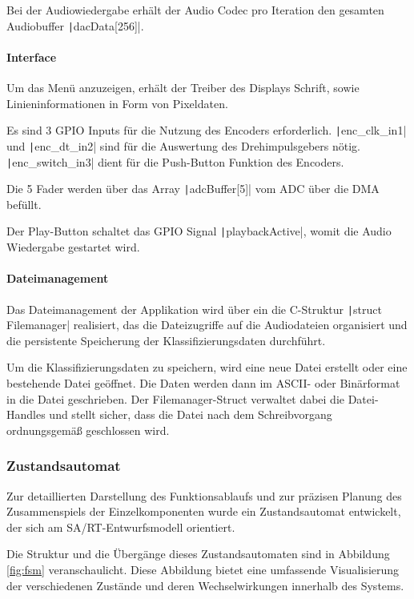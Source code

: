 Bei der Audiowiedergabe erhält der Audio Codec pro Iteration den gesamten Audiobuffer \texttt|dacData[256]|.

\paragraph{Interface}

Um das Menü anzuzeigen, erhält der Treiber des Displays Schrift, sowie Linieninformationen in Form von Pixeldaten. 

Es sind 3 GPIO Inputs für die Nutzung des Encoders erforderlich. \texttt|enc_clk_in1| und \texttt|enc_dt_in2| sind für die Auswertung des Drehimpulsgebers nötig. \texttt|enc_switch_in3| dient für die Push-Button Funktion des Encoders.

Die 5 Fader werden über das Array \texttt|adcBuffer[5]| vom ADC über die DMA befüllt.

Der Play-Button schaltet das GPIO Signal \texttt|playbackActive|, womit die Audio Wiedergabe gestartet wird.

\paragraph{Dateimanagement}

Das Dateimanagement der Applikation wird über ein die C-Struktur \texttt|struct Filemanager| realisiert, das die Dateizugriffe auf die Audiodateien organisiert und die persistente Speicherung der Klassifizierungsdaten durchführt.  

Um die Klassifizierungsdaten zu speichern, wird eine neue Datei erstellt oder eine bestehende Datei geöffnet. Die Daten werden dann im ASCII- oder Binärformat in die Datei geschrieben. Der Filemanager-Struct verwaltet dabei die Datei-Handles und stellt sicher, dass die Datei nach dem Schreibvorgang ordnungsgemäß geschlossen wird.

\subsubsection{Zustandsautomat}

Zur detaillierten Darstellung des Funktionsablaufs und zur präzisen Planung des Zusammenspiels der Einzelkomponenten wurde ein Zustandsautomat entwickelt, der sich am SA/RT-Entwurfsmodell orientiert. 

Die Struktur und die Übergänge dieses Zustandsautomaten sind in Abbildung \ref{fig:fsm} veranschaulicht. Diese Abbildung bietet eine umfassende Visualisierung der verschiedenen Zustände und deren Wechselwirkungen innerhalb des Systems.

